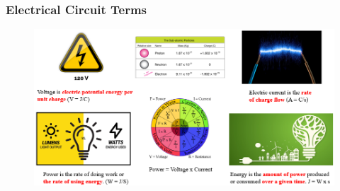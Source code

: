 \documentclass{beamer}
\begin{document}
\begin{frame}\frametitle{Electrical Circuit Terms}
\begin{figure}
\includegraphics[scale=0.50]{fig/terms.png} 
\end{figure}
\end{frame}
\end{document}
